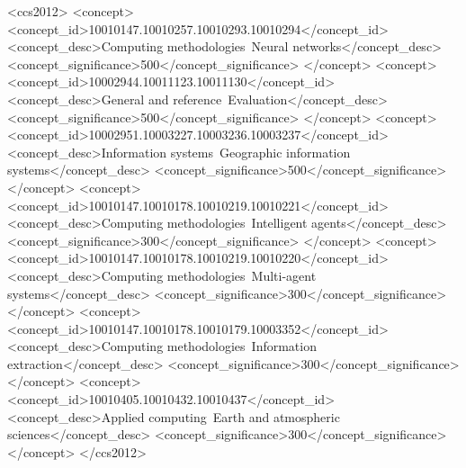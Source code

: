 \documentclass[sigconf]{acmart}
\begin{document}
\begin{CCSXML}
<ccs2012>
   <concept>
       <concept_id>10010147.10010257.10010293.10010294</concept_id>
       <concept_desc>Computing methodologies~Neural networks</concept_desc>
       <concept_significance>500</concept_significance>
       </concept>
   <concept>
       <concept_id>10002944.10011123.10011130</concept_id>
       <concept_desc>General and reference~Evaluation</concept_desc>
       <concept_significance>500</concept_significance>
       </concept>
   <concept>
       <concept_id>10002951.10003227.10003236.10003237</concept_id>
       <concept_desc>Information systems~Geographic information systems</concept_desc>
       <concept_significance>500</concept_significance>
       </concept>
   <concept>
       <concept_id>10010147.10010178.10010219.10010221</concept_id>
       <concept_desc>Computing methodologies~Intelligent agents</concept_desc>
       <concept_significance>300</concept_significance>
       </concept>
   <concept>
       <concept_id>10010147.10010178.10010219.10010220</concept_id>
       <concept_desc>Computing methodologies~Multi-agent systems</concept_desc>
       <concept_significance>300</concept_significance>
       </concept>
   <concept>
       <concept_id>10010147.10010178.10010179.10003352</concept_id>
       <concept_desc>Computing methodologies~Information extraction</concept_desc>
       <concept_significance>300</concept_significance>
       </concept>
   <concept>
       <concept_id>10010405.10010432.10010437</concept_id>
       <concept_desc>Applied computing~Earth and atmospheric sciences</concept_desc>
       <concept_significance>300</concept_significance>
       </concept>
 </ccs2012>
\end{CCSXML}


\end{document}
